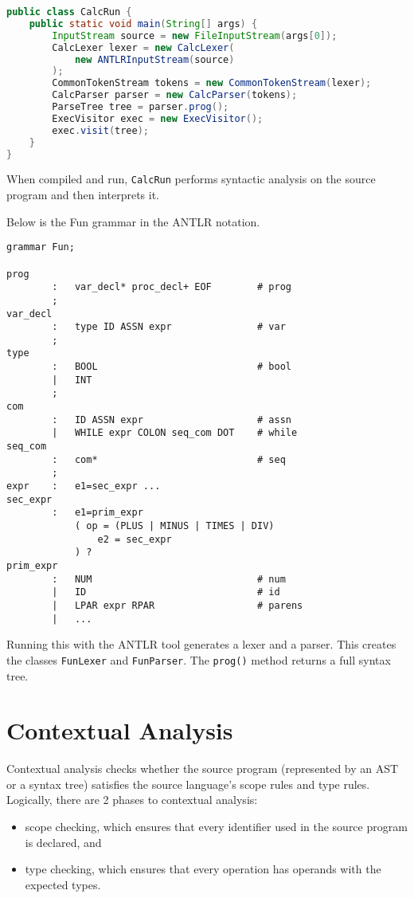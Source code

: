 \documentclass[a4paper, openany]{memoir}
\begin{document}
\begin{lstlisting}[language=java]
public class CalcRun {
    public static void main(String[] args) {
        InputStream source = new FileInputStream(args[0]);
        CalcLexer lexer = new CalcLexer(
            new ANTLRInputStream(source)
        );
        CommonTokenStream tokens = new CommonTokenStream(lexer);
        CalcParser parser = new CalcParser(tokens);
        ParseTree tree = parser.prog();
        ExecVisitor exec = new ExecVisitor();
        exec.visit(tree);
    }
}
\end{lstlisting}
When compiled and run, \texttt{CalcRun} performs syntactic analysis on the source program and then interprets it.

Below is the Fun grammar in the ANTLR notation.
\begin{verbatim}
grammar Fun;

prog    
        :   var_decl* proc_decl+ EOF        # prog
        ;
var_decl
        :   type ID ASSN expr               # var
        ;
type
        :   BOOL                            # bool
        |   INT
        ;
com
        :   ID ASSN expr                    # assn
        |   WHILE expr COLON seq_com DOT    # while
seq_com
        :   com*                            # seq
        ;
expr    :   e1=sec_expr ...
sec_expr
        :   e1=prim_expr
            ( op = (PLUS | MINUS | TIMES | DIV)
                e2 = sec_expr
            ) ?
prim_expr
        :   NUM                             # num
        |   ID                              # id
        |   LPAR expr RPAR                  # parens
        |   ...
\end{verbatim}
Running this with the ANTLR tool generates a lexer and a parser. This creates the classes \texttt{FunLexer} and \texttt{FunParser}. The \texttt{prog()} method returns a full syntax tree.
\newpage

\section{Contextual Analysis}
Contextual analysis checks whether the source program (represented by an AST or a syntax tree) satisfies the source language's scope rules and type rules. Logically, there are 2 phases to contextual analysis:
\begin{itemize}
    \item scope checking, which ensures that every identifier used in the source program is declared, and
    \item type checking, which ensures that every operation has operands with the expected types.
\end{itemize}
\end{document}
